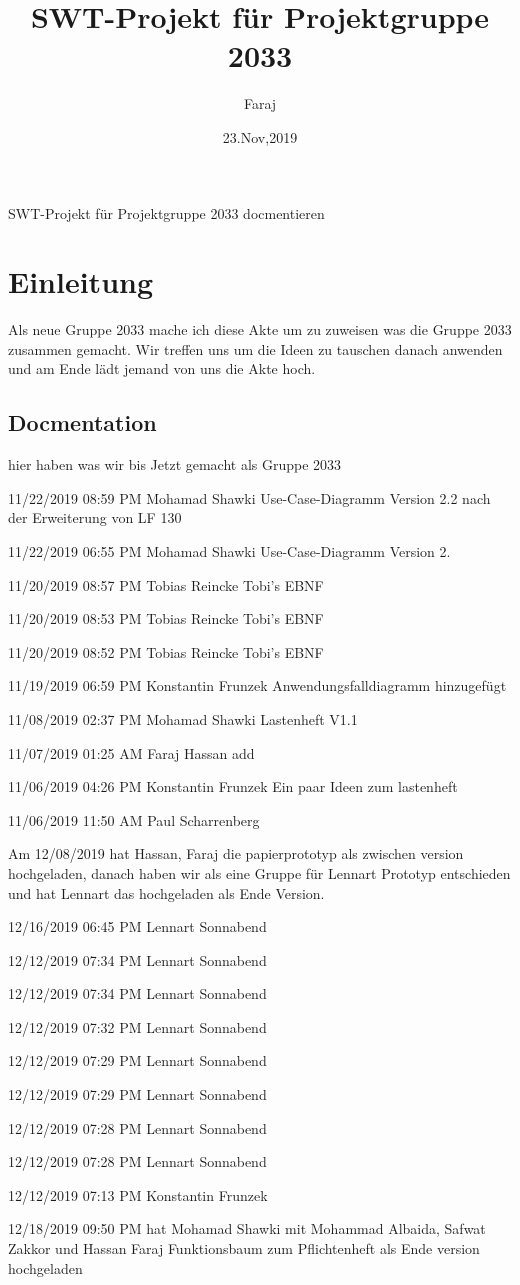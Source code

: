 \documentclass[10pt, a4paper]{scrartcl}
\title{SWT-Projekt für Projektgruppe 2033}
\author{Faraj}
\date{23.Nov,2019}
\begin{document}
\maketitle
\tableofcontents
SWT-Projekt für Projektgruppe 2033
docmentieren 

\section {Einleitung}
Als neue Gruppe 2033 mache ich diese Akte um zu zuweisen was die Gruppe 2033 zusammen gemacht. Wir treffen uns um die Ideen zu tauschen danach anwenden und am Ende lädt jemand von uns die Akte hoch.
 
\subsection {Docmentation}
 hier haben was wir bis Jetzt gemacht als Gruppe 2033 
 
 
11/22/2019 08:59 PM	Mohamad Shawki	
 Use-Case-Diagramm Version 2.2 nach der Erweiterung von LF 130

11/22/2019 06:55 PM	Mohamad Shawki	
 Use-Case-Diagramm Version 2.

11/20/2019 08:57 PM	Tobias Reincke	
 Tobi's EBNF

11/20/2019 08:53 PM	Tobias Reincke	
 Tobi's EBNF

11/20/2019 08:52 PM	Tobias Reincke	
 Tobi's EBNF

11/19/2019 06:59 PM	Konstantin Frunzek	
 Anwendungsfalldiagramm hinzugefügt

11/08/2019 02:37 PM	Mohamad Shawki	
 Lastenheft V1.1

11/07/2019 01:25 AM	Faraj Hassan	
 add

11/06/2019 04:26 PM	Konstantin Frunzek	
 Ein paar Ideen zum lastenheft

11/06/2019 11:50 AM	Paul Scharrenberg 

Am 12/08/2019 hat Hassan, Faraj die papierprototyp als zwischen version hochgeladen, danach haben wir als eine Gruppe für Lennart Prototyp entschieden und hat Lennart das hochgeladen als Ende Version.

12/16/2019 06:45 PM	Lennart Sonnabend
	
12/12/2019 07:34 PM	Lennart Sonnabend	

12/12/2019 07:34 PM	Lennart Sonnabend	

12/12/2019 07:32 PM	Lennart Sonnabend	

12/12/2019 07:29 PM	Lennart Sonnabend	

12/12/2019 07:29 PM	Lennart Sonnabend	

12/12/2019 07:28 PM	Lennart Sonnabend	

12/12/2019 07:28 PM	Lennart Sonnabend	

12/12/2019 07:13 PM	Konstantin Frunzek	

12/18/2019 09:50 PM hat Mohamad Shawki mit Mohammad Albaida, Safwat      
   Zakkor und Hassan Faraj Funktionsbaum zum Pflichtenheft als Ende 
   version hochgeladen 
\end{document}
